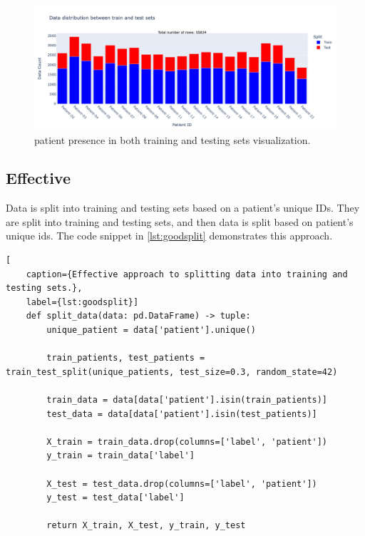                     \begin{figure}[H]
                        \centering
                        \includegraphics[width=1.0\textwidth]{../src/resources/plots/splits/bad.png}
                        \caption{
                            patient presence in both training and testing sets visualization.
                        }
                        \label{fig:badsplit}
                    \end{figure}
        
                    \newpage

            \subsection{Effective} \label{sec:goodsplit}
            Data is split into training and testing sets based on a patient's unique IDs. They are split into training and testing sets, and then data is split based on patient's unique ids. The code snippet in \ref{lst:goodsplit} demonstrates this approach.

\begin{lstlisting}[
    caption={Effective approach to splitting data into training and testing sets.}, 
    label={lst:goodsplit}]
    def split_data(data: pd.DataFrame) -> tuple:    
        unique_patient = data['patient'].unique()

        train_patients, test_patients = train_test_split(unique_patients, test_size=0.3, random_state=42)

        train_data = data[data['patient'].isin(train_patients)]
        test_data = data[data['patient'].isin(test_patients)] 

        X_train = train_data.drop(columns=['label', 'patient'])
        y_train = train_data['label']

        X_test = test_data.drop(columns=['label', 'patient'])
        y_test = test_data['label']
        
        return X_train, X_test, y_train, y_test
\end{lstlisting}

